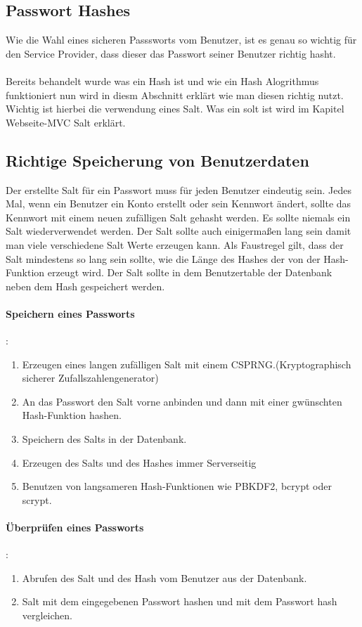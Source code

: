 {\subsection{Passwort Hashes}
\label{sec:pwdhash}
Wie die Wahl eines sicheren Passsworts vom Benutzer, ist es genau so wichtig für den Service Provider, dass dieser das Passwort seiner Benutzer richtig hasht.\\ \\Bereits behandelt wurde was ein Hash ist und wie ein Hash Alogrithmus funktioniert nun wird in diesm Abschnitt erklärt wie man diesen richtig nutzt. Wichtig ist hierbei die verwendung eines Salt. Was ein solt ist wird im Kapitel Webseite-MVC Salt erklärt.
\subsection{Richtige Speicherung von Benutzerdaten}
Der erstellte Salt für ein Passwort muss für jeden Benutzer eindeutig sein. Jedes Mal, wenn ein Benutzer ein Konto erstellt oder sein Kennwort ändert, sollte das Kennwort mit einem neuen zufälligen Salt gehasht werden. Es sollte niemals ein Salt wiederverwendet werden. Der Salt sollte auch einigermaßen lang sein damit man viele verschiedene Salt Werte erzeugen kann. Als Faustregel gilt, dass der Salt mindestens so lang sein sollte, wie die Länge des Hashes der von der Hash-Funktion erzeugt wird. Der Salt sollte in dem Benutzertable der Datenbank neben dem Hash gespeichert werden.
\paragraph{Speichern eines Passworts}:\\
\begin{enumerate}
\item Erzeugen eines langen zufälligen Salt mit einem CSPRNG.(Kryptographisch sicherer Zufallszahlengenerator) 
\item An das Passwort den Salt vorne anbinden und dann mit einer gwünschten Hash-Funktion hashen.
\item Speichern des Salts in der Datenbank.
\item Erzeugen des Salts und des Hashes immer Serverseitig
\item Benutzen von langsameren Hash-Funktionen wie  PBKDF2, bcrypt oder scrypt.
\end{enumerate}
\paragraph{Überprüfen eines Passworts}:\\
\begin{enumerate}
\item Abrufen des Salt und des Hash vom Benutzer aus der Datenbank.
\item Salt mit dem eingegebenen Passwort hashen und mit dem Passwort hash vergleichen.
\end{enumerate}
}
